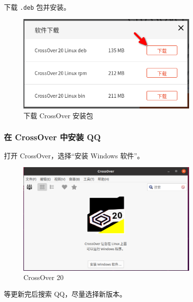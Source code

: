 \documentclass[UTF-8]{ctexart}
\begin{document}
				下载 \texttt{.deb} 包并安装。
				
				\begin{figure}[H]
					\centering
					\includegraphics[width=0.8\textwidth]{fig/crossover_download_deb.png}
					\caption*{下载 CrossOver 安装包}
				\end{figure}
			
			\subsubsection{在 CrossOver 中安装 QQ}
			
				打开 CrossOver，选择“安装 Windows 软件”。
				
				\begin{figure}[H]
					\centering
					\includegraphics[width=0.8\textwidth]{fig/crossover_greet.png}
					\caption*{CrossOver 20}
				\end{figure}
			
				等更新完后搜索 QQ，尽量选择新版本。
				
\end{document}
